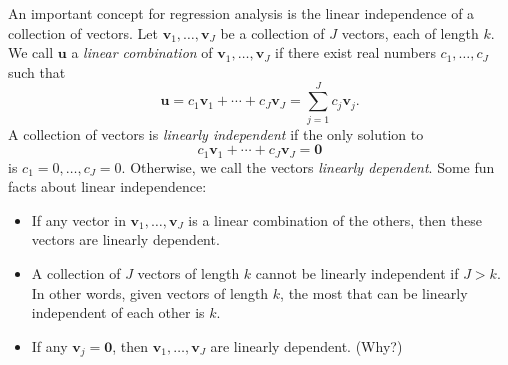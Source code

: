 \documentclass[12pt,oneside,openany]{book}
\begin{document}
An important concept for regression analysis is the linear independence
of a collection of vectors. Let \(\mathbf{v}_1, \ldots, \mathbf{v}_J\)
be a collection of \(J\) vectors, each of length \(k\). We call
\(\mathbf{u}\) a \emph{linear combination} of
\(\mathbf{v}_1, \ldots, \mathbf{v}_J\) if there exist real numbers
\(c_1, \ldots, c_J\) such that \[
\mathbf{u} = c_1 \mathbf{v}_1 + \cdots + c_J \mathbf{v}_J = \sum_{j=1}^J c_j \mathbf{v}_j.
\] A collection of vectors is \emph{linearly independent} if the only
solution to \[
c_1 \mathbf{v}_1 + \cdots + c_J \mathbf{v}_J = \mathbf{0}
\] is \(c_1 = 0, \ldots, c_J = 0\). Otherwise, we call the vectors
\emph{linearly dependent}. Some fun facts about linear independence:

\begin{itemize}
\item
  If any vector in \(\mathbf{v}_1, \ldots, \mathbf{v}_J\) is a linear
  combination of the others, then these vectors are linearly dependent.
\item
  A collection of \(J\) vectors of length \(k\) cannot be linearly
  independent if \(J > k\). In other words, given vectors of length
  \(k\), the most that can be linearly independent of each other is
  \(k\).
\item
  If any \(\mathbf{v}_j = \mathbf{0}\), then
  \(\mathbf{v}_1, \ldots, \mathbf{v}_J\) are linearly dependent. (Why?)
\end{itemize}
\end{document}
